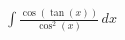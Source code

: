 \documentclass[preview]{standalone}
\begin{document}
\begin{align*}
\int \frac{\cos(\tan(x))}{\cos^2(x)} \, dx
\end{align*}
\end{document}
